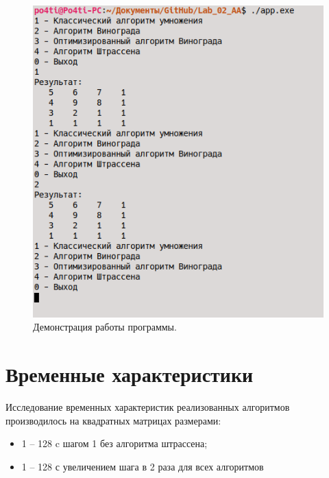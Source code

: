 \begin{figure}[ht!]
	\centering
	\includegraphics[width=170mm]{img/img_prog.png}
	\caption{Демонстрация работы программы.\label{overflow}}
	\label{fig:img_prog}
	\end{figure}


\clearpage

\section{Временные характеристики}


Исследование временных характеристик реализованных алгоритмов производилось на квадратных матрицах размерами:

\begin{itemize}
    \item 1 -- 128 c шагом 1 без алгоритма штрассена;
    \item 1 -- 128 с увеличением шага в 2 раза для всех алгоритмов
\end{itemize}

%     

